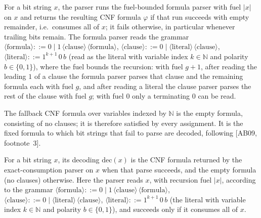 \begin{definition}
\label{Std.Sat.CNF.parse}
\leanok
{}
For a bit string $x$, the parser runs the fuel-bounded formula parser with fuel $|x|$ on $x$
and returns the resulting CNF formula $\varphi$ if that run succeeds with empty remainder,
i.e.\ consumes all of $x$; it fails otherwise, in particular whenever trailing bits remain.
The formula parser reads the grammar
$\langle\text{formula}\rangle ::= 0 \mid 1\,\langle\text{clause}\rangle\,\langle\text{formula}\rangle$,
$\langle\text{clause}\rangle ::= 0 \mid \langle\text{literal}\rangle\,\langle\text{clause}\rangle$,
$\langle\text{literal}\rangle ::= 1^{k+1}\,0\,b$ (read as the literal with variable index
$k \in \mathbb{N}$ and polarity $b \in \{0,1\}$), where the fuel bounds the recursion: with
fuel $g+1$, after reading the leading $1$ of a clause the formula parser parses that clause
and the remaining formula each with fuel $g$, and after reading a literal the clause parser
parses the rest of the clause with fuel $g$; with fuel $0$ only a terminating $0$ can be
read.
\end{definition}

\begin{definition}
\label{Std.Sat.CNF.fallback}
\leanok
The fallback CNF formula over variables indexed by $\mathbb{N}$ is the empty formula,
consisting of no clauses; it is therefore satisfied by every assignment. It is the fixed
formula to which bit strings that fail to parse are decoded, following [AB09, footnote~3].
\end{definition}

\begin{definition}
\label{Std.Sat.CNF.decode}
\leanok
{}
For a bit string $x$, its decoding $\mathrm{dec}(x)$ is the CNF formula returned by the
exact-consumption parser on $x$ when that parse succeeds, and the empty formula (no clauses)
otherwise. Here the parser reads $x$, with recursion fuel $|x|$, according to the grammar
$\langle\text{formula}\rangle ::= 0 \mid 1\,\langle\text{clause}\rangle\,\langle\text{formula}\rangle$,
$\langle\text{clause}\rangle ::= 0 \mid \langle\text{literal}\rangle\,\langle\text{clause}\rangle$,
$\langle\text{literal}\rangle ::= 1^{k+1}\,0\,b$ (the literal with variable index
$k \in \mathbb{N}$ and polarity $b \in \{0,1\}$), and succeeds only if it consumes all of
$x$.
\end{definition}

